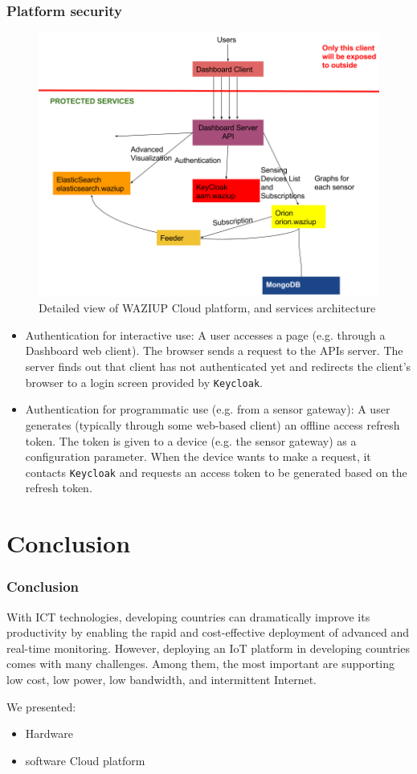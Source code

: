 \documentclass{beamer}
\begin{document}
\begin{frame}
\frametitle{Platform security}
  
  \begin{figure}[H]
  \centering
  \includegraphics[width=.6\linewidth]{figures/ServicesArchitecture.png}
  \caption{Detailed view of WAZIUP Cloud platform, and services architecture}
  \label{fig-services}
  \end{figure}

  \begin{itemize}
  \item Authentication for interactive use:
  A user accesses a page (e.g. through a Dashboard web client).
  The browser sends a request to the APIs server.
  The server finds out that client has not authenticated yet and redirects the client's browser to a login screen provided by {\tt Keycloak}.
  
  
  \item Authentication for programmatic use (e.g. from a sensor gateway):
  A user generates (typically through some web-based client) an offline access refresh token.
  The token is given to a device (e.g.
  the sensor gateway) as a configuration parameter.
  When the device wants to make a request, it contacts {\tt Keycloak} and requests an access token to be generated based on the refresh token.
  
  
  \end{itemize}

\end{frame}


\section{Conclusion}

\begin{frame}
\frametitle{Conclusion}
  
With ICT technologies, developing countries can dramatically improve its productivity by enabling the rapid and cost-effective deployment of advanced and real-time monitoring.
However, deploying an IoT platform in developing countries comes with many challenges.
Among them, the most important are supporting low cost, low power, low bandwidth, and intermittent Internet.

We presented:
  \begin{itemize}
    \item Hardware
    \item software Cloud platform 
  \end{itemize}

\end{frame}
\end{document}
